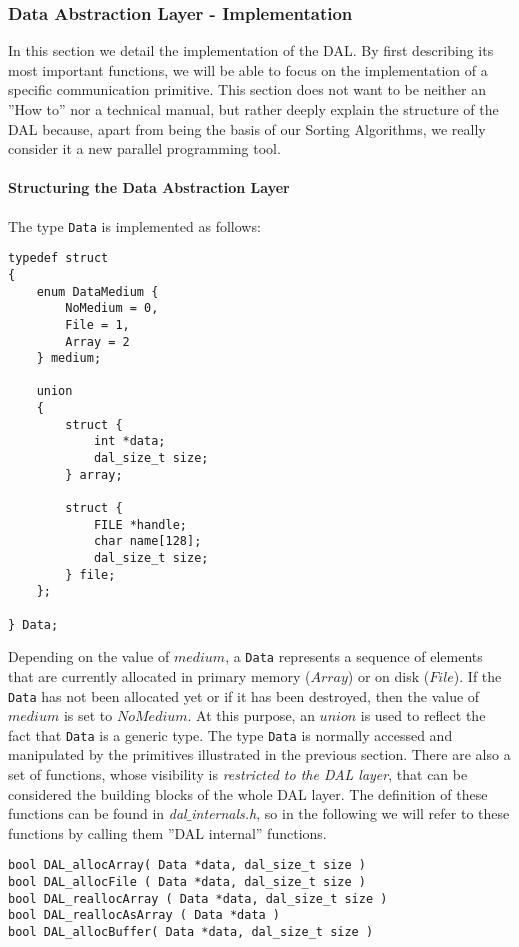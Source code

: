 \subsubsection{Data Abstraction Layer - Implementation}
\label{DAL-impl}
In this section we detail the implementation of the DAL. By first describing its most important functions, we will be able to focus on the implementation of a specific communication primitive. This section does not want to be neither an ''How to'' nor a technical manual, but rather deeply explain the structure of the DAL because, apart from being the basis of our Sorting Algorithms, we really consider it a new parallel programming tool.

\paragraph{Structuring the Data Abstraction Layer}
The type \texttt{Data} is implemented as follows:
\begin{lstlisting}
typedef struct
{
	enum DataMedium {
		NoMedium = 0,
		File = 1,
		Array = 2
	} medium;
	
	union 
	{
		struct {
			int *data;
			dal_size_t size;
		} array;
		
		struct {
			FILE *handle;
			char name[128];
			dal_size_t size;
		} file;
	};
	
} Data;
\end{lstlisting}
Depending on the value of $medium$, a \texttt{Data} represents a sequence of elements that are currently allocated in primary memory ($Array$) or on disk ($File$). If the \texttt{Data} has not been allocated yet or if it has been destroyed, then the value of $medium$ is set to $NoMedium$. At this purpose, an $union$ is used to reflect the fact that \texttt{Data} is a generic type. The type \texttt{Data} is normally accessed and manipulated by the primitives illustrated in the previous section. There are also a set of functions, whose visibility is \textit{restricted to the DAL layer}, that can be considered the building blocks of the whole DAL layer. The definition of these functions can be found in \textit{dal$\_$internals.h}, so in the following we will refer to these functions by calling them ''DAL internal'' functions.
\begin{lstlisting}
bool DAL_allocArray( Data *data, dal_size_t size )
bool DAL_allocFile ( Data *data, dal_size_t size )
bool DAL_reallocArray ( Data *data, dal_size_t size )
bool DAL_reallocAsArray ( Data *data )
bool DAL_allocBuffer( Data *data, dal_size_t size )
\end{lstlisting}
